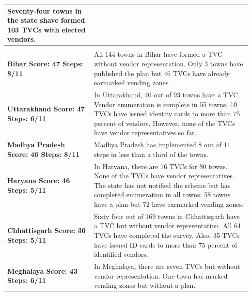 \documentclass[a4paper, 12pt, twoside]{article}
\begin{document}
\begin{longtable}[l]{>{\raggedright}p{4cm}>{\raggedright\arraybackslash}p{10cm}}
Seventy-four towns in the state shave formed 103 TVCs with elected vendors.
\\
\midrule
\multicolumn{2}{l}{States with Moderate Compliance (Index Score Between 50 to 59)}\\
\midrule
\cellcolor{SVACyellow1}\bf{Bihar}
\newline
\bf{Score: 47}
\newline
\bf{Steps: 8/11}
&
\cellcolor{SVACyellow2}All 144 towns in Bihar have formed a TVC without vendor representation. Only 3 towns have published the plan but 46 TVCs have already earmarked vending zones.
\\
\cellcolor{SVACyellow1}\bf{Uttarakhand}
\newline
\bf{Score: 47}
\newline
\bf{Steps: 6/11}
&
\cellcolor{SVACyellow2}In Uttarakhand, 40 out of 93 towns have a TVC. Vendor enumeration is complete in 55 towns. 10 TVCs have issued identity cards to more than 75 percent of vendors. However, none of the TVCs have vendor representatives so far.
\\
\cellcolor{SVACyellow1}\bf{Madhya Pradesh}
\newline
\bf{Score: 46}
\newline
\bf{Steps: 8/11}
&
\cellcolor{SVACyellow2}Madhya Pradesh has implemented 8 out of 11 steps in less than a third of the towns.
\\
\cellcolor{SVACyellow1}\bf{Haryana}
\newline
\bf{Score: 46}
\newline
\bf{Steps: 5/11}
&
\cellcolor{SVACyellow2}In Haryana, there are 76 TVCs for 80 towns. None of the TVCs have vendor representatives. The state has not notified the scheme but has completed enumeration in all towns; 58 towns have a plan but 72 have earmarked vending zones.
\\
\cellcolor{SVACyellow1}\bf{Chhattisgarh}
\newline
\bf{Score: 36}
\newline
\bf{Steps: 5/11}
&
\cellcolor{SVACyellow2}Sixty four out of 169 towns in Chhattisgarh have a TVC but without vendor representation. All 64 TVCs have completed the survey. Also, 35 TVCs have issued ID cards to more than 75 percent of identified vendors.
\\
\cellcolor{SVACyellow1}\bf{Meghalaya}
\newline
\bf{Score: 43}
\newline
\bf{Steps: 6/11}
&
\cellcolor{SVACyellow2}In Meghalaya, there are seven TVCs but without vendor representation. One town has marked vending zones but without a plan.

\end{longtable}
\end{document}
